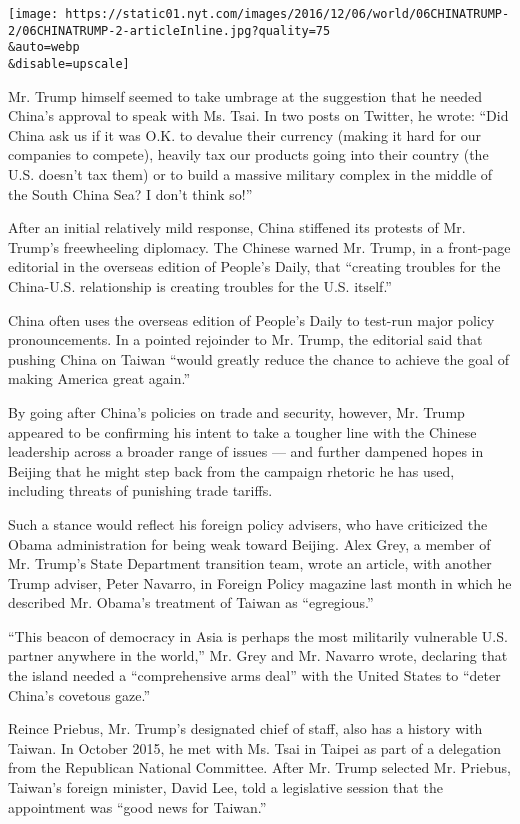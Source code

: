 \texttt{[image: https://static01.nyt.com/images/2016/12/06/world/06CHINATRUMP-2/06CHINATRUMP-2-articleInline.jpg?quality=75\\\&auto=webp\\\&disable=upscale]}

Mr. Trump himself seemed to take umbrage at the suggestion that he
needed China's approval to speak with Ms. Tsai. In two posts on Twitter,
he wrote: ``Did China ask us if it was O.K. to devalue their currency
(making it hard for our companies to compete), heavily tax our products
going into their country (the U.S. doesn't tax them) or to build a
massive military complex in the middle of the South China Sea? I don't
think so!''

After an initial relatively mild response, China stiffened its protests
of Mr. Trump's freewheeling diplomacy. The Chinese warned Mr. Trump, in
a front-page editorial in the overseas edition of People's Daily, that
``creating troubles for the China-U.S. relationship is creating troubles
for the U.S. itself.''

China often uses the overseas edition of People's Daily to test-run
major policy pronouncements. In a pointed rejoinder to Mr. Trump, the
editorial said that pushing China on Taiwan ``would greatly reduce the
chance to achieve the goal of making America great again.''

By going after China's policies on trade and security, however, Mr.
Trump appeared to be confirming his intent to take a tougher line with
the Chinese leadership across a broader range of issues --- and further
dampened hopes in Beijing that he might step back from the campaign
rhetoric he has used, including threats of punishing trade tariffs.

Such a stance would reflect his foreign policy advisers, who have
criticized the Obama administration for being weak toward Beijing. Alex
Grey, a member of Mr. Trump's State Department transition team, wrote an
article, with another Trump adviser, Peter Navarro, in Foreign Policy
magazine last month in which he described Mr. Obama's treatment of
Taiwan as ``egregious.''

``This beacon of democracy in Asia is perhaps the most militarily
vulnerable U.S. partner anywhere in the world,'' Mr. Grey and Mr.
Navarro wrote, declaring that the island needed a ``comprehensive arms
deal'' with the United States to ``deter China's covetous gaze.''

Reince Priebus, Mr. Trump's designated chief of staff, also has a
history with Taiwan. In October 2015, he met with Ms. Tsai in Taipei as
part of a delegation from the Republican National Committee. After Mr.
Trump selected Mr. Priebus, Taiwan's foreign minister, David Lee, told a
legislative session that the appointment was ``good news for Taiwan.''

